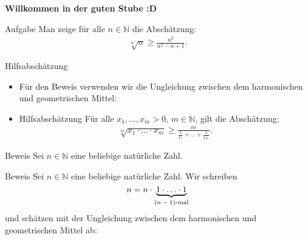 \documentclass[10pt]{beamer}
\title{}
\author{Artur's Mathematikstübchen}
\date{}
\def\bN{\mathbb{N}}
\begin{document}

\begin{frame}
    \begin{center}
        \textbf{\huge Willkommen in der guten Stube \newline \newline :D}
    \end{center}
\end{frame}




\begin{frame}{}
    \begin{alertblock}{Aufgabe}
        Man zeige für alle \( n \in \bN \) die Abschätzung:
        \begin{align*}
            \sqrt[n]{n}
        	\geq \frac{n^{2}}{n^{2} - n + 1}.
        \end{align*}
    \end{alertblock}
\end{frame}



\begin{frame}{Hilfsabschätzung}
    \begin{itemize}
        \item<1-> Für den Beweis verwenden wir die Ungleichung zwischen dem harmonischen und geometrischen Mittel: 
        \item<2->
        \begin{block}{Hilfsabschätzung}
            Für alle \( x_{1}, \ldots, x_{m} > 0 \), \( m \in \bN \), gilt die Abschätzung:
            \begin{align*}
                \sqrt[m]{x_{1} \cdot \ldots \cdot x_{m}}
                \geq \frac{m}{\frac{1}{x_{1}} + \ldots + \frac{1}{x_{m}}}.
            \end{align*}
        \end{block}
    \end{itemize}
\end{frame}



\begin{frame}{Beweis}
    Sei \( n \in \bN \) eine beliebige natürliche Zahl.
\end{frame}



\begin{frame}{Beweis}
    Sei \( n \in \bN \) eine beliebige natürliche Zahl. Wir schreiben 
    \[ 
        n = n \cdot \underbrace{1 \cdot \ldots \cdot 1}_{\text{\( \left( n - 1 \right) \)-mal}} 
    \] 
    und schätzen mit der Ungleichung zwischen dem harmonischen und geometrischen Mittel ab:
\end{frame}
\end{document}
